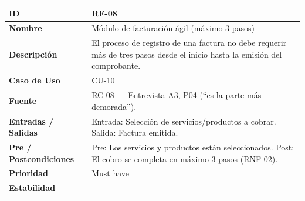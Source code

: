 \documentclass[
]{article}
\newcounter{none} %
\begin{document}
{\def\LTcaptype{none} %
\begin{longtable}[]{|
  >{\raggedright\arraybackslash}p{}|
  >{\raggedright\arraybackslash}p{}|}
\hline
\begin{minipage}[b]{\linewidth}\raggedright
\textbf{ID}
\end{minipage} & \begin{minipage}[b]{\linewidth}\raggedright
RF-08
\end{minipage} \\
\hline
\endhead
\hline
\endlastfoot
\textbf{Nombre} & \begin{minipage}[t]{\linewidth}\raggedright
Módulo de facturación ágil (máximo 3 pasos)
\end{minipage} \\
\hline
\textbf{Descripción} & \begin{minipage}[t]{\linewidth}\raggedright
El proceso de registro de una factura no debe requerir más de tres pasos desde el inicio hasta la emisión del comprobante.
\end{minipage} \\
\hline
\textbf{Caso de Uso} & \begin{minipage}[t]{\linewidth}\raggedright
CU-10
\end{minipage} \\
\hline
\textbf{Fuente} & \begin{minipage}[t]{\linewidth}\raggedright
RC-08 — Entrevista A3, P04 (“es la parte más demorada”).
\end{minipage} \\
\hline
\textbf{Entradas / Salidas} & \begin{minipage}[t]{\linewidth}\raggedright
Entrada: Selección de servicios/productos a cobrar. Salida: Factura emitida.
\end{minipage} \\
\hline
\textbf{Pre / Postcondiciones} & \begin{minipage}[t]{\linewidth}\raggedright
Pre: Los servicios y productos están seleccionados. Post: El cobro se completa en máximo 3 pasos (RNF-02).
\end{minipage} \\
\hline
\textbf{Prioridad} & \begin{minipage}[t]{\linewidth}\raggedright
Must have
\end{minipage} \\
\hline
\textbf{Estabilidad} & \begin{minipage}[t]{\linewidth}\raggedright

\end{minipage}
\end{longtable}}
\end{document}
